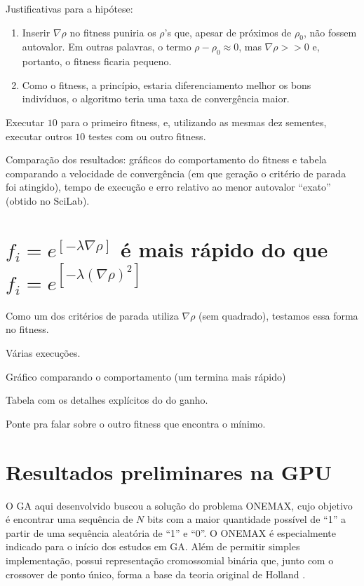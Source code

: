 	Justificativas para a hipótese: 
	
	\begin{enumerate}
		\item Inserir $\nabla \rho$ no fitness puniria os $\rho$'s que, apesar de próximos de $\rho_0$, não fossem autovalor. Em outras palavras, o termo $\rho - \rho_0 \approx 0$, mas $\nabla \rho >> 0$ e, portanto, o fitness ficaria pequeno.
		
		\item Como o fitness, a princípio, estaria diferenciamento melhor os bons indivíduos, o algoritmo teria uma taxa de convergência maior.
		
	\end{enumerate}
	
		Executar $10$ para o primeiro fitness, e, utilizando as mesmas dez sementes, executar outros $10$ testes com ou outro fitness.
		
		Comparação dos resultados: gráficos do comportamento do fitness e tabela comparando a velocidade de convergência (em que geração o critério de parada foi atingido), tempo de execução e erro relativo ao menor autovalor ``exato'' (obtido no SciLab).

	\section{$f_i = e^{[-\lambda \nabla \rho]}$ é mais rápido do que $f_i = e^{[-\lambda (\nabla \rho)^2]}$}
	
	Como um dos critérios de parada utiliza $\nabla \rho$ (sem quadrado), testamos essa forma no fitness.
	
	Várias execuções.
	
	Gráfico comparando o comportamento (um termina mais rápido)
	
	Tabela com os detalhes explícitos do do ganho.
	
	Ponte pra falar sobre o outro fitness que encontra o mínimo.
	
	\section{Resultados preliminares na GPU}
	
		O GA aqui desenvolvido buscou a solução do problema ONEMAX, cujo objetivo é encontrar uma sequência de $N$ bits com a maior quantidade possível de “1” a partir de uma sequência aleatória de “1” e “0”. O ONEMAX é especialmente indicado para o início dos estudos em GA. Além de permitir simples implementação, possui representação cromossomial binária que, junto com o crossover de ponto único, forma a base da teoria original de Holland \cite{Linden2008}.

